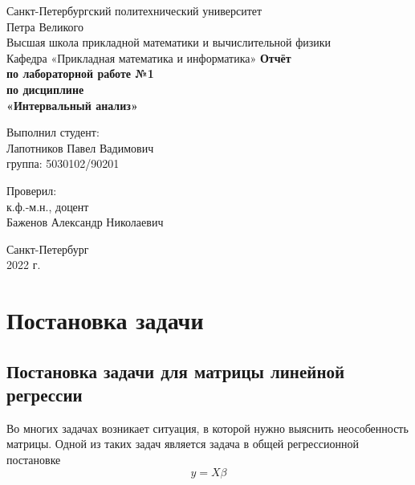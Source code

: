 \documentclass[12pt,a4paper]{article}
\begin{document}
	\begin{titlepage}
		\begin{center}		
			\vfill	
			Санкт-Петербургский политехнический университет \\
			Петра Великого\\
			\vskip 1cm
			Высшая школа прикладной математики и вычислительной физики \\
			Кафедра «Прикладная математика и информатика»
			\vfill
			\textbf{Отчёт\\
				по лабораторной работе №1\\
				по дисциплине\\
				«Интервальный анализ»\\}
			\vfill
		\end{center}
		\vfill
		\hfill
		\begin{minipage}{0.4\textwidth}
			Выполнил студент:\\
			Лапотников Павел Вадимович\\
			группа: 5030102/90201\\
		\end{minipage}
		\vfill
		\hfill 
		\begin{minipage}{0.4\textwidth}
			Проверил:\\
			к.ф.-м.н., доцент\\
			Баженов Александр Николаевич\
		\end{minipage}
		\vfill
		\hfill 
		\begin{center}
			Санкт-Петербург\\2022 г.
		\end{center}
	\end{titlepage}
	
	\tableofcontents
	\listoffigures
	\pagebreak
	
	\section{Постановка задачи}
	    
	    \subsection{Постановка задачи для матрицы линейной регрессии} \label{problem:lin_reg}
    	    Во многих задачах возникает ситуация, в которой нужно выяснить неособенность матрицы. Одной из таких задач является задача в общей регрессионной постановке
    	    \begin{equation}
    	        y = X\beta
    	    \end{equation}
	    
\end{document}
